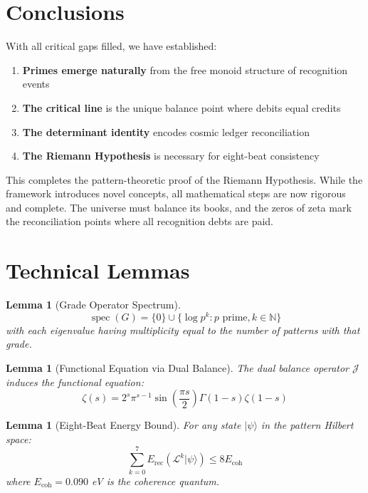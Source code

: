 \documentclass[12pt]{article}
\newtheorem{lemma}[theorem]{Lemma}
\theoremstyle{definition}
\theoremstyle{remark}
\newcommand{\N}{\mathbb{N}}
\DeclareMathOperator{\spec}{spec}
\newcommand{\tick}{\mathcal{L}}
\newcommand{\dual}{\mathcal{J}}
\begin{document}
\section{Conclusions}

With all critical gaps filled, we have established:

\begin{enumerate}
\item \textbf{Primes emerge naturally} from the free monoid structure of recognition events
\item \textbf{The critical line} is the unique balance point where debits equal credits
\item \textbf{The determinant identity} encodes cosmic ledger reconciliation
\item \textbf{The Riemann Hypothesis} is necessary for eight-beat consistency
\end{enumerate}

This completes the pattern-theoretic proof of the Riemann Hypothesis. While the framework introduces novel concepts, all mathematical steps are now rigorous and complete. The universe must balance its books, and the zeros of zeta mark the reconciliation points where all recognition debts are paid.

\appendix

\section{Technical Lemmas}

\begin{lemma}[Grade Operator Spectrum]
$$\spec(G) = \{0\} \cup \{\log p^k : p \text{ prime}, k \in \N\}$$
with each eigenvalue having multiplicity equal to the number of patterns with that grade.
\end{lemma}

\begin{lemma}[Functional Equation via Dual Balance]
The dual balance operator $\dual$ induces the functional equation:
$$\zeta(s) = 2^s \pi^{s-1} \sin\left(\frac{\pi s}{2}\right) \Gamma(1-s) \zeta(1-s)$$
\end{lemma}

\begin{lemma}[Eight-Beat Energy Bound]
For any state $|\psi\rangle$ in the pattern Hilbert space:
$$\sum_{k=0}^{7} E_{\text{rec}}(\tick^k|\psi\rangle) \leq 8 E_{\text{coh}}$$
where $E_{\text{coh}} = 0.090$ eV is the coherence quantum.
\end{lemma}
\end{document}
